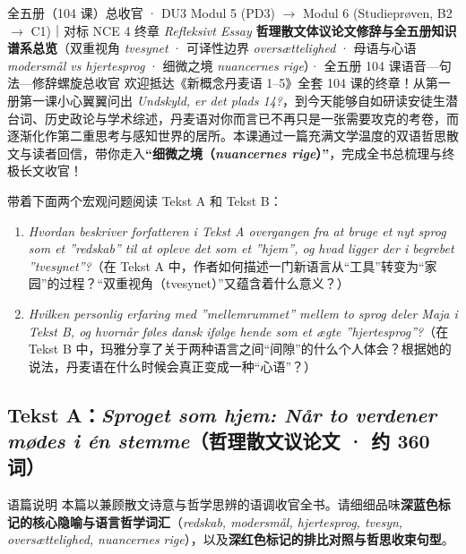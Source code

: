 {全五册（104 课）总收官 · DU3 Modul 5 (PD3) $\rightarrow$ Modul 6 (Studieprøven, B2 $\rightarrow$ C1)｜对标 NCE 4 终章 \textit{Refleksivt Essay}}
{\textbf{哲理散文体议论文修辞与全五册知识谱系总览}（双重视角 \textit{tvesynet} · 可译性边界 \textit{oversættelighed} · 母语与心语 \textit{modersmål vs hjertesprog} · 细微之境 \textit{nuancernes rige}）· 全五册 104 课语音—句法—修辞螺旋总收官}
{欢迎抵达《新概念丹麦语 1--5》全套 104 课的终章！从第一册第一课小心翼翼问出 \textit{Undskyld, er det plads 14?}，到今天能够自如研读安徒生潜台词、历史政论与学术综述，丹麦语对你而言已不再只是一张需要攻克的考卷，而逐渐化作第二重思考与感知世界的居所。本课通过一篇充满文学温度的双语哲思散文与读者回信，带你走入\textbf{“细微之境（\textit{nuancernes rige}）”}，完成全书总梳理与终极长文收官！}

\begin{foerduleaeser}
带着下面两个宏观问题阅读 Tekst A 和 Tekst B：
\begin{enumerate}
  \item \textit{Hvordan beskriver forfatteren i Tekst A overgangen fra at bruge et nyt sprog som et ”redskab” til at opleve det som et ”hjem”, og hvad ligger der i begrebet ”tvesynet”?}（在 Tekst A 中，作者如何描述一门新语言从“工具”转变为“家园”的过程？“双重视角（tvesynet）”又蕴含着什么意义？）
  \item \textit{Hvilken personlig erfaring med ”mellemrummet” mellem to sprog deler Maja i Tekst B, og hvornår føles dansk ifølge hende som et ægte ”hjertesprog”?}（在 Tekst B 中，玛雅分享了关于两种语言之间“间隙”的什么个人体会？根据她的说法，丹麦语在什么时候会真正变成一种“心语”？）
\end{enumerate}
\end{foerduleaeser}


\subsection*{Tekst A：\textit{Sproget som hjem: Når to verdener mødes i én stemme}（哲理散文议论文 · 约 360 词）}

\begin{tipbox}{语篇说明}
本篇以兼顾散文诗意与哲学思辨的语调收官全书。请细细品味\textbf{\color{NCDNavy}深蓝色标记的核心隐喻与语言哲学词汇}（\textit{redskab, modersmål, hjertesprog, tvesyn, oversættelighed, nuancernes rige}），以及\textbf{\color{NCDRed}深红色标记的排比对照与哲思收束句型}。
\end{tipbox}

